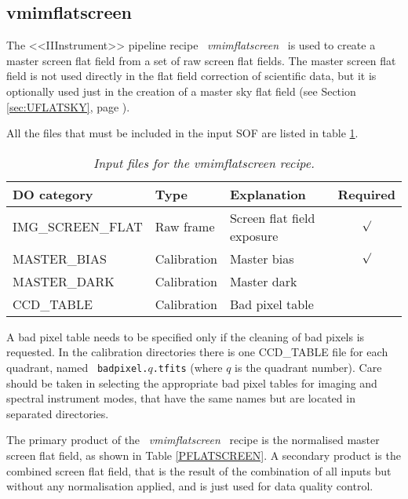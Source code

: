\subsection{vmimflatscreen}
\label{sec:UFLATSCREEN}

The <<IIInstrument>> pipeline recipe \ {\it vmimflatscreen} \ is used to create 
a master screen flat field from a set of raw screen flat fields.
The master screen flat field is not used directly in the flat field
correction of scientific data, but it is optionally used just in
the creation of a master sky flat field (see Section \ref{sec:UFLATSKY},
page \pageref{sec:UFLATSKY}).

All the files that must be included in the input SOF are listed in table 
\ref{tab:IFLATSCREEN}.

\begin{table}[h]
  \begin{center}
    \begin{tabular}{|l|l|l|c|}
    \hline
      {\bf DO category} & {\bf Type} & {\bf Explanation} & {\bf Required} \\
    \hline 
      IMG\_SCREEN\_FLAT  & Raw frame   & Screen flat field exposure & $\surd$ \\
      MASTER\_BIAS    & Calibration & Master bias           & $\surd$ \\
      MASTER\_DARK    & Calibration & Master dark           &         \\
      CCD\_TABLE      & Calibration & Bad pixel table       &         \\
    \hline
    \end{tabular}
    \caption{\it Input files for the vmimflatscreen recipe.}
    \label{tab:IFLATSCREEN}
  \end{center}
\end{table}

A bad pixel table needs to be specified only if the cleaning of bad
pixels is requested. In the calibration directories there is one
CCD\_TABLE file for each quadrant, named \ {\tt badpixel.}$q${\tt .tfits}
(where $q$ is the quadrant number). Care should be taken in selecting
the appropriate bad pixel tables for imaging and spectral instrument
modes, that have the same names but are located in separated directories.

The primary product of the \ {\it vmimflatscreen} \ recipe is the normalised
master screen flat field, as shown in Table \ref{PFLATSCREEN}. 
A secondary product is the combined screen flat field, that is
the result of the combination of all inputs but without any
normalisation applied, and is just used for data quality control. 

